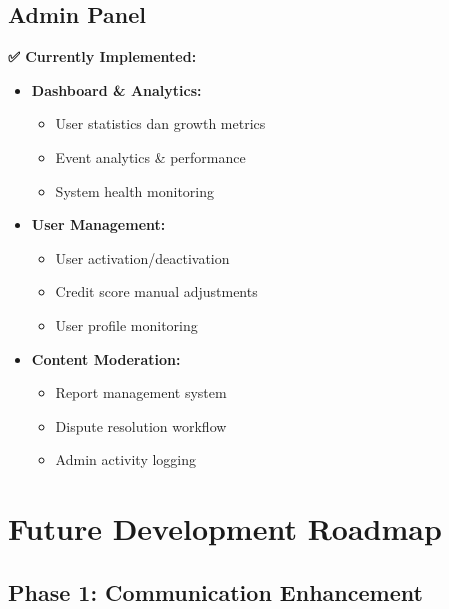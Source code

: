 \documentclass[12pt,a4paper]{article}
\begin{document}
\subsection{Admin Panel}

\begin{implemented}
\textbf{✅ Currently Implemented:}
\begin{itemize}
    \item \textbf{Dashboard \& Analytics:}
    \begin{itemize}
        \item User statistics dan growth metrics
        \item Event analytics \& performance
        \item System health monitoring
    \end{itemize}
    \item \textbf{User Management:}
    \begin{itemize}
        \item User activation/deactivation
        \item Credit score manual adjustments
        \item User profile monitoring
    \end{itemize}
    \item \textbf{Content Moderation:}
    \begin{itemize}
        \item Report management system
        \item Dispute resolution workflow
        \item Admin activity logging
    \end{itemize}
\end{itemize}
\end{implemented}

\section{Future Development Roadmap}

\subsection{Phase 1: Communication Enhancement}
\end{document}

